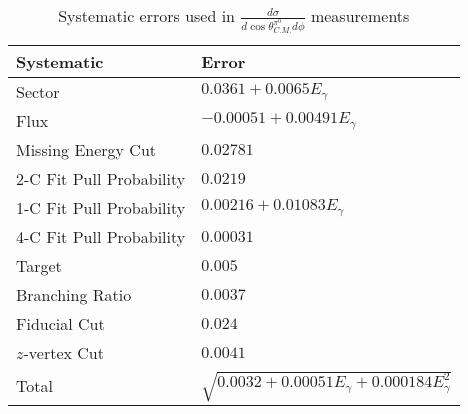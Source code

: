 \begin{table}[h!]
\begin{minipage}{\textwidth}
\begin{center}
\begin{singlespacing}

\caption[Systematics]{\label{tab:systematics}Systematic errors used in $\frac{d\sigma}{d\cos\theta^{\pi^0}_{C.M.} d\phi}$ measurements \vspace{0.75mm}}

\begin{tabular}{p{5cm} | p{7cm}}
\hline
Systematic & Error \\
\hline
Sector  & $ 0.0361 + 0.0065E_{\gamma}$ \\
Flux  & $ -0.00051 + 0.00491E_{\gamma}$ \\
Missing Energy Cut  & $0.02781$ \\
2-C Fit Pull Probability & $0.0219$ \\
1-C Fit Pull Probability  & $ 0.00216 + 0.01083E_{\gamma}$ \\
4-C Fit Pull Probability  & $0.00031$ \\ 
Target  & $0.005$ \\
Branching Ratio  & $0.0037$ \\
Fiducial Cut & $0.024$ \\
$z$-vertex Cut & $0.0041$ \\
Total & $\sqrt{0.0032 +0.00051E_{\gamma} +0.000184E_{\gamma}^2}$ \\
\hline \hline
\end{tabular}

\end{singlespacing}
\end{center}
\end{minipage}
\end{table}
\vspace{20pt}